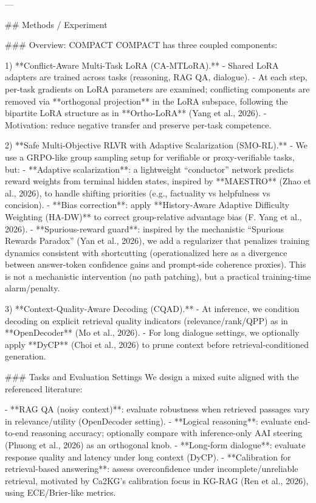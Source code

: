 ---

## Methods / Experiment  

### Overview: COMPACT  
COMPACT has three coupled components:

1) **Conflict-Aware Multi-Task LoRA (CA-MTLoRA).**  
   - Shared LoRA adapters are trained across tasks (reasoning, RAG QA, dialogue).  
   - At each step, per-task gradients on LoRA parameters are examined; conflicting components are removed via **orthogonal projection** in the LoRA subspace, following the bipartite LoRA structure as in **Ortho-LoRA** (Yang et al., 2026).  
   - Motivation: reduce negative transfer and preserve per-task competence.

2) **Safe Multi-Objective RLVR with Adaptive Scalarization (SMO-RL).**  
   - We use a GRPO-like group sampling setup for verifiable or proxy-verifiable tasks, but:
     - **Adaptive scalarization**: a lightweight “conductor” network predicts reward weights from terminal hidden states, inspired by **MAESTRO** (Zhao et al., 2026), to handle shifting priorities (e.g., factuality vs helpfulness vs concision).
     - **Bias correction**: apply **History-Aware Adaptive Difficulty Weighting (HA-DW)** to correct group-relative advantage bias (F. Yang et al., 2026).
     - **Spurious-reward guard**: inspired by the mechanistic “Spurious Rewards Paradox” (Yan et al., 2026), we add a regularizer that penalizes training dynamics consistent with shortcutting (operationalized here as a divergence between answer-token confidence gains and prompt-side coherence proxies). This is not a mechanistic intervention (no path patching), but a practical training-time alarm/penalty.

3) **Context-Quality-Aware Decoding (CQAD).**  
   - At inference, we condition decoding on explicit retrieval quality indicators (relevance/rank/QPP) as in **OpenDecoder** (Mo et al., 2026).  
   - For long dialogue settings, we optionally apply **DyCP** (Choi et al., 2026) to prune context before retrieval-conditioned generation.

### Tasks and Evaluation Settings  
We design a mixed suite aligned with the referenced literature:

- **RAG QA (noisy context)**: evaluate robustness when retrieved passages vary in relevance/utility (OpenDecoder setting).  
- **Logical reasoning**: evaluate end-to-end reasoning accuracy; optionally compare with inference-only AAI steering (Phuong et al., 2026) as an orthogonal knob.  
- **Long-form dialogue**: evaluate response quality and latency under long context (DyCP).  
- **Calibration for retrieval-based answering**: assess overconfidence under incomplete/unreliable retrieval, motivated by Ca2KG’s calibration focus in KG-RAG (Ren et al., 2026), using ECE/Brier-like metrics.


